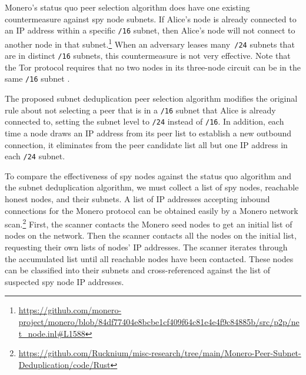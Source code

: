 \documentclass[english]{mrl}
\theoremstyle{plain}
\begin{document}
Monero's status quo peer selection algorithm does have one existing
countermeasure against spy node subnets. If Alice's node is already
connected to an IP address within a specific \texttt{/16} subnet,
then Alice's node will not connect to another node in that subnet.\footnote{\href{https://github.com/monero-project/monero/blob/84df77404e8bcbe1cf409f64c81e4e4f9c84885b/src/p2p/net_node.inl\#L1588}{https://github.com/monero-project/monero/blob/84df77404e8bcbe1cf409f64c81e4e4f9c84885b/src/p2p/net\_node.inl\#L1588}}
When an adversary leases many\texttt{ /24} subnets that are in distinct
\texttt{/16} subnets, this countermeasure is not very effective. Note
that the Tor protocol requires that no two nodes in its three-node
circuit can be in the same \texttt{/16} subnet \cite{Rochet2020}.

The proposed subnet deduplication peer selection algorithm modifies
the original rule about not selecting a peer that is in a \texttt{/16}
subnet that Alice is already connected to, setting the subnet level
to \texttt{/24} instead of \texttt{/16}. In addition, each time a
node draws an IP address from its peer list to establish a new outbound
connection, it eliminates from the peer candidate list all but one
IP address in each \texttt{/24} subnet.

To compare the effectiveness of spy nodes against the status quo algorithm
and the subnet deduplication algorithm, we must collect a list of
spy nodes, reachable honest nodes, and their subnets. A list of IP
addresses accepting inbound connections for the Monero protocol can
be obtained easily by a Monero network scan.\footnote{\href{https://github.com/Rucknium/misc-research/tree/main/Monero-Peer-Subnet-Deduplication/code/Rust}{https://github.com/Rucknium/misc-research/tree/main/Monero-Peer-Subnet-Deduplication/code/Rust}}
First, the scanner contacts the Monero seed nodes to get an initial
list of nodes on the network. Then the scanner contacts all the nodes
on the initial list, requesting their own lists of nodes' IP addresses.
The scanner iterates through the accumulated list until all reachable
nodes have been contacted. These nodes can be classified into their
subnets and cross-referenced against the list of suspected spy node
IP addresses.
\end{document}
